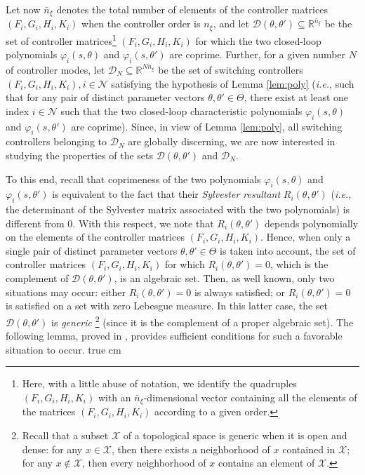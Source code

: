 \documentclass[letterpaper, 10 pt, conference]{ieeetran}
\def\salt{\vskip 0.2 true cm}
\begin{document}
Let now $\bar n_\xi$ denotes the total number of elements of the controller matrices $(F_i, G_i, H_i, K_i)$ when the controller
order is $n_\xi$, and let $\mathcal D(\theta,\theta') \subseteq \mathbb R^{\bar n_\xi}$  be the set of  controller matrices\footnote{Here, with a little abuse
of notation, we identify the quadruples $(F_i, G_i, H_i, K_i)$ with an $\bar n_\xi$-dimensional vector containing all the elements of the matrices
$(F_i, G_i, H_i, K_i)$  according to a given order.} $(F_i, G_i, H_i, K_i)$ for which 
the two closed-loop polynomials $\varphi_i(s,\theta)$ and $\varphi_i(s,\theta')$ are coprime. Further, for a given number $N$ of controller modes, let
$\mathcal D_N \subseteq \mathbb R^{N \bar n_\xi}$ be the set of switching controllers  $(F_i, G_i, H_i, K_i), i  \in \mathcal N$ satisfying the hypothesis of Lemma 
\ref{lem:poly} (\emph{i.e.}, such that  for any pair of distinct parameter vectors $\theta, \theta' \in \Theta$, there exist at least one index $i \in \mathcal N$ 
such that the two closed-loop characteristic polynomials $\varphi_i(s,\theta)$ and $\varphi_i(s,\theta')$ are coprime). Since, in view of Lemma 
\ref{lem:poly}, all switching controllers belonging to $\mathcal D_N$ are globally discerning, we are now interested in studying the properties of the sets
$\mathcal D(\theta,\theta') $ and $\mathcal D_N$.

To this end, recall that coprimeness of the two polynomials $\varphi_i(s,\theta)$ and $\varphi_i(s,\theta')$ is equivalent to the fact that their 
\emph{Sylvester resultant} $R_i(\theta,\theta')$ (\emph{i.e.}, the determinant
of the Sylvester matrix associated with the two polynomials) is different from $0$. With this respect, we note that $R_i(\theta,\theta')$ depends polynomially on the elements
of the controller matrices $(F_i, G_i, H_i, K_i)$. Hence, when only a single pair of distinct parameter vectors $\theta, \theta' \in \Theta$ is taken into account,
the set of controller matrices $(F_i, G_i, H_i, K_i)$ for which $R_i(\theta,\theta')=0$, which is the complement of $\mathcal D(\theta,\theta') $, is an algebraic set.
Then, as well known, only two situations may occur: either $R_i(\theta,\theta')=0$ is always satisfied; or $R_i(\theta,\theta')=0$ is satisfied on a set with zero Lebesgue measure.
In this latter case, the set $\mathcal D(\theta,\theta') $ is \emph{generic}
\footnote{Recall that a subset $\mathcal X$ of a topological space is generic when it is open and dense: for any $x \in \mathcal X$, then there exists a neighborhood of $x$ contained in $\mathcal X$; for any $x \notin \mathcal X$, then every neighborhood of $x$ contains an element of $\mathcal X$.} (since it is the complement of a proper algebraic set). The following lemma, proved in \cite{Ba13}, provides sufficient conditions for such a favorable situation to occur.
 \salt
\end{document}
